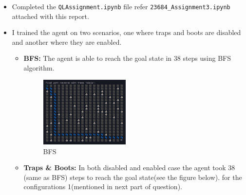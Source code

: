 \documentclass{article}
\begin{document}
\begin{itemize}
    \item Completed the \texttt{QLAssignment.ipynb} file refer \texttt{23684\_Assignment3.ipynb} attached with this report.
    
    \item I trained the agent  on  two  scenarios,  one  where  traps  and  boots  are  disabled  and another where they are enabled. 
    \begin{itemize}
        \item \textbf{BFS:} The agent is able to reach the goal state in 38 steps using BFS algorithm.
        \begin{figure}[h]
            \centering
            \includegraphics[width=0.45\textwidth]{Path.png}
            \caption{BFS}
            \label{fig:bfs}
        \end{figure}

        \item \textbf{Traps \& Boots:} In both disabled and enabled case the agent took 38 (same as BFS) steps to reach the goal state(see the figure below).  for the configurations 1(mentioned in next part of question).


\end{itemize}
\end{itemize}
\end{document}
